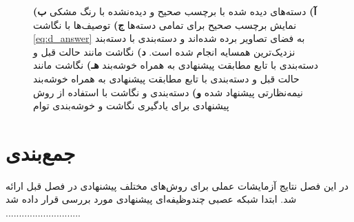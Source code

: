 \begin{figure}[t]
{  \textbf{آ)}
   دسته‌های دیده شده با برچسب صحیح و دیده‌نشده با رنگ مشکی
\textbf{ب)}
 نمایش برچسب صحیح برای تمامی دسته‌ها
  \textbf{ج)} توصیف‌ها با نگاشت \eqref{eq:d_answer}
  به فضای تصاویر برده شده‌اند و دسته‌بندی با دسته‌بند نزدیک‌ترین همسایه انجام شده است.
  \textbf{د)}
   نگاشت مانند حالت قبل و دسته‌بندی با تابع مطابقت پیشنهادی به همراه خوشه‌بند 
  \textbf{هـ)}
   نگاشت مانند حالت قبل و دسته‌بندی با تابع مطابقت پیشنهادی به همراه خوشه‌بند نیمه‌نظارتی پیشنهاد شده
  \textbf{و)}
  دسته‌بندی و نگاشت با استفاده از روش پیشنهادی برای یادگیری نگاشت و خوشه‌بندی توام
  }
\label{fig:discussion}
\end{figure}

\section{جمع‌بندی}
در این فصل نتایج آزمایشات عملی برای روش‌های مختلف پیشنهادی در فصل قبل ارائه شد. ابتدا شبکه عصبی چندوظیفه‌ای پیشنهادی مورد بررسی قرار داده شد ............................
